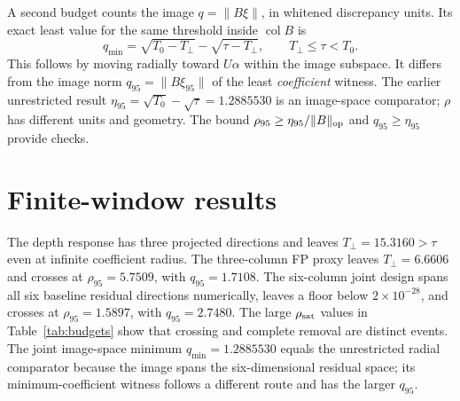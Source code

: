 \documentclass[aps,prd,reprint,onecolumn,superscriptaddress,nofootinbib]{revtex4-2}
\begin{document}
A second budget counts the image $q=\|B\xi\|$, in whitened discrepancy units. Its exact least value for the same threshold inside $\operatorname{col}B$ is
\begin{equation}
 q_{\min}=\sqrt{T_0-T_\perp}-\sqrt{\tau-T_\perp},\qquad T_\perp\leq\tau<T_0.\label{eq:qmin}
\end{equation}
This follows by moving radially toward $U\alpha$ within the image subspace. It differs from the image norm $q_{95}=\|B\xi_{95}\|$ of the least \emph{coefficient} witness. The earlier unrestricted result $\eta_{95}=\sqrt{T_0}-\sqrt\tau=1.2885530$ is an image-space comparator; $\rho$ has different units and geometry. The bound $\rho_{95}\geq\eta_{95}/\|B\|_{\rm op}$ and $q_{95}\geq\eta_{95}$ provide checks.

\section{Finite-window results}


The depth response has three projected directions and leaves $T_\perp=15.3160>\tau$ even at infinite coefficient radius. The three-column FP proxy leaves $T_\perp=6.6606$ and crosses at $\rho_{95}=5.7509$, with $q_{95}=1.7108$. The six-column joint design spans all six baseline residual directions numerically, leaves a floor below $2\times10^{-28}$, and crosses at $\rho_{95}=1.5897$, with $q_{95}=2.7480$. The large $\rho_{\rm sat}$ values in Table~\ref{tab:budgets} show that crossing and complete removal are distinct events. The joint image-space minimum $q_{\min}=1.2885530$ equals the unrestricted radial comparator because the image spans the six-dimensional residual space; its minimum-coefficient witness follows a different route and has the larger $q_{95}$.
\end{document}
